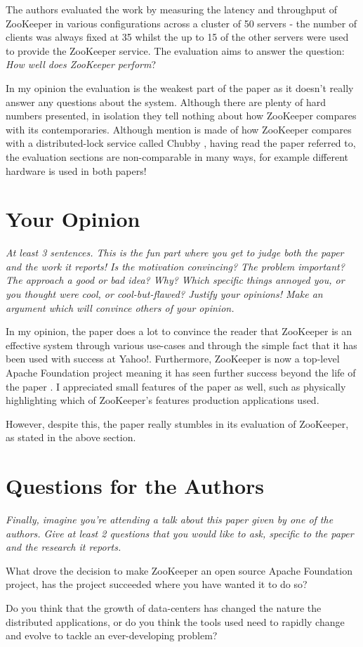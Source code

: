 \documentclass[11pt]{article}
\begin{document}
The authors evaluated the work by measuring the latency and throughput of
ZooKeeper in various configurations across a cluster of 50 servers - the number
of clients was always fixed at 35 whilst the up to 15 of the other servers were
used to provide the ZooKeeper service. The evaluation aims to answer the
question: \textit{How well does ZooKeeper perform}?

In my opinion the evaluation is the weakest part of the paper as it doesn't
really answer any questions about the system. Although there are plenty of hard
numbers presented, in isolation they tell nothing about how ZooKeeper compares
with its contemporaries. Although mention is made of how ZooKeeper compares
with a distributed-lock service called Chubby \cite{Chubby}, having read the
paper referred to, the evaluation sections are non-comparable in many ways, for
example different hardware is used in both papers!

\section*{Your Opinion}

\textsl{At least 3 sentences. This is the fun part where you get to judge both
the paper and the work it reports! Is the motivation convincing? The problem
important? The approach a good or bad idea? Why? Which specific things annoyed
you, or you thought were cool, or cool-but-flawed? Justify your opinions! Make
an argument which will convince others of your opinion.}

In my opinion, the paper does a lot to convince the reader that ZooKeeper is an
effective system through various use-cases and through the simple fact that it
has been used with success at Yahoo!. Furthermore, ZooKeeper is now a top-level
Apache Foundation project meaning it has seen further success beyond the life
of the paper \cite{ApacheZooKeeper}. I appreciated small features of the paper
as well, such as physically highlighting which of ZooKeeper's features
production applications used.

However, despite this, the paper really stumbles in its evaluation of
ZooKeeper, as stated in the above section.

\section*{Questions for the Authors}

\textsl{Finally, imagine you're attending a talk about this paper given by one
of the authors. Give at least 2 questions that you would like to ask, specific
to the paper and the research it reports.}

What drove the decision to make ZooKeeper an open source Apache Foundation
project, has the project succeeded where you have wanted it to do so?

Do you think that the growth of data-centers has changed the nature the
distributed applications, or do you think the tools used need to rapidly change
and evolve to tackle an ever-developing problem?




\end{document}
